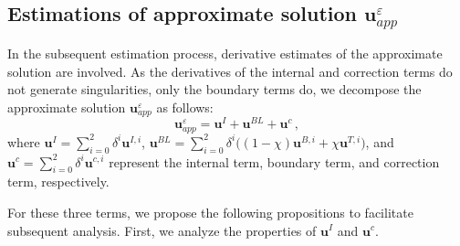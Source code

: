 \documentclass[pdflatex,sn-mathphys-num]{sn-jnl}%
\theoremstyle{thmstyleone}%
\theoremstyle{thmstyletwo}%
\theoremstyle{thmstylethree}%
\theoremstyle{thmstyletwo}
\begin{document}
\subsection{Estimations of approximate solution $\boldsymbol{u}_{app}^\varepsilon$}\label{subsec3.1}
In the subsequent estimation process, derivative estimates of the approximate solution are involved. As the derivatives of the internal and correction terms do not generate singularities, only the boundary terms do, we decompose the approximate solution $\boldsymbol{u}^\varepsilon_{app}$ as follows: 
\begin{equation}\label{3.1}
	\boldsymbol{u}^\varepsilon_{app}=\boldsymbol{u}^I+\boldsymbol{u}^{BL}+\boldsymbol{u}^c\,,
\end{equation}
where $\boldsymbol{u}^I=\sum_{i=0}^{2}
{\delta}^i\boldsymbol u^{I,i}$, $\boldsymbol{u}^{BL}=\sum_{i=0}^{2}
{\delta}^i\big(
(1-\chi)\boldsymbol u^{B,i}
+\chi\boldsymbol u^{T,i}\big)$, and $\boldsymbol{u}^c=\sum_{i=0}^{2}\delta^i\boldsymbol u^{c,i}$ represent the internal term, boundary term, and correction term, respectively. 





For these three terms, we propose the following propositions to facilitate subsequent analysis.
First, we analyze the properties of $\boldsymbol{u}^I$ and $\boldsymbol{u}^c$.
\end{document}
